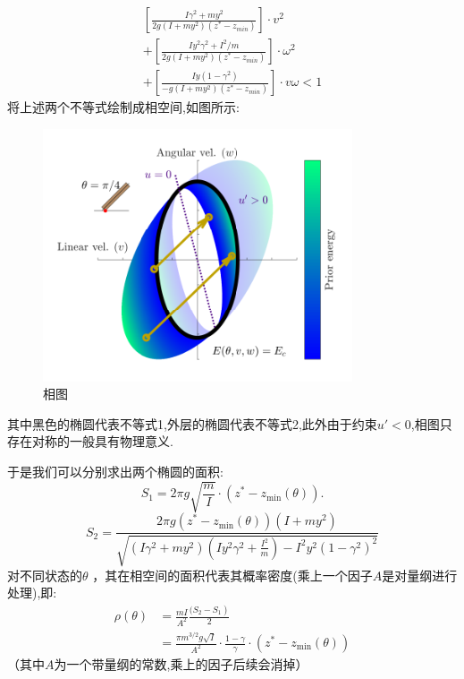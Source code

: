 \documentclass[UTF8]{gapd}
\begin{document}
\begin{equation}
\begin{gathered}
\left[ \frac{I\gamma ^2+my^2}{2g\left( I+my^2 \right) \left( z^*-z_{min} \right)} \right] \cdot v^2
\\
+\left[ \frac{Iy^2\gamma ^2+I^2/m}{2g\left( I+my^2 \right) \left( z^*-z_{min} \right)} \right] \cdot \omega ^2
\\
+\left[ \frac{Iy\left( 1-\gamma ^2 \right)}{-g\left( I+my^2 \right) \left( z^*-z_{min} \right)} \right] \cdot v\omega <1
\end{gathered}
\end{equation}
将上述两个不等式绘制成相空间,如图所示:
\begin{figure}[h]%
	\centering
	\includegraphics[width=1\columnwidth]{images/相图}
	\caption{相图\cite{c3}}
	\label{fig:P2}%
\end{figure}
其中黑色的椭圆代表不等式1,外层的椭圆代表不等式2,此外由于约束$u'<0$,相图只存在对称的一般具有物理意义.

于是我们可以分别求出两个椭圆的面积:
\begin{equation}
S_{1}=2 \pi g \sqrt{\frac{m}{I}} \cdot\left(z^{*}-z_{\min }(\theta)\right) .
\end{equation}
\begin{equation}
S_{2}=\frac{2 \pi g\left(z^{*}-z_{\min }(\theta)\right)\left(I+m y^{2}\right)}{\sqrt{\left(I \gamma^{2}+m y^{2}\right)\left(I y^{2} \gamma^{2}+\frac{I^{2}}{m}\right)-I^{2} y^{2}\left(1-\gamma^{2}\right)^{2}}}
\end{equation}
对不同状态的$\theta$   ，其在相空间的面积代表其概率密度(乘上一个因子$A$是对量纲进行处理),即:
\begin{equation}
\begin{aligned}
\rho(\theta) &=\frac{m I}{A^{2}} \frac{\left.(S_{2}-S_{1}\right)}{2} \\
&=\frac{\pi m^{3 / 2} g \sqrt{I}}{
	A 
	^{2}} \cdot \frac{1-\gamma}{\gamma} \cdot\left(z^{*}-z_{\min }(\theta)\right)
\end{aligned}
\end{equation}
（其中$ A$为一个带量纲的常数,乘上的因子后续会消掉）
\end{document}
